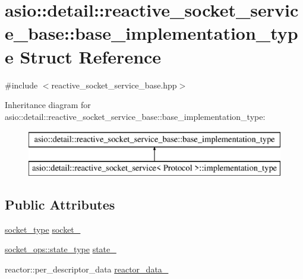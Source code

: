 \hypertarget{structasio_1_1detail_1_1reactive__socket__service__base_1_1base__implementation__type}{}\section{asio\+:\+:detail\+:\+:reactive\+\_\+socket\+\_\+service\+\_\+base\+:\+:base\+\_\+implementation\+\_\+type Struct Reference}
\label{structasio_1_1detail_1_1reactive__socket__service__base_1_1base__implementation__type}


{\ttfamily \#include $<$reactive\+\_\+socket\+\_\+service\+\_\+base.\+hpp$>$}

Inheritance diagram for asio\+:\+:detail\+:\+:reactive\+\_\+socket\+\_\+service\+\_\+base\+:\+:base\+\_\+implementation\+\_\+type\+:\begin{figure}[H]
\begin{center}
\leavevmode
\includegraphics[height=2.000000cm]{structasio_1_1detail_1_1reactive__socket__service__base_1_1base__implementation__type}
\end{center}
\end{figure}
\subsection*{Public Attributes}
\begin{DoxyCompactItemize}
\item 
\hyperlink{namespaceasio_1_1detail_a6798c771dd84b79798b1a08150706ea9}{socket\+\_\+type} \hyperlink{structasio_1_1detail_1_1reactive__socket__service__base_1_1base__implementation__type_ac3ee4518bc9fc746904070cfe607513c}{socket\+\_\+}
\item 
\hyperlink{namespaceasio_1_1detail_1_1socket__ops_a5ce32ee297edef8833113ea35a933054}{socket\+\_\+ops\+::state\+\_\+type} \hyperlink{structasio_1_1detail_1_1reactive__socket__service__base_1_1base__implementation__type_a53bbe651bd173ef81d6627468ebabc2d}{state\+\_\+}
\item 
reactor\+::per\+\_\+descriptor\+\_\+data \hyperlink{structasio_1_1detail_1_1reactive__socket__service__base_1_1base__implementation__type_a2d17d5782c98bd1c61e91dfa67083edb}{reactor\+\_\+data\+\_\+}
\end{DoxyCompactItemize}


